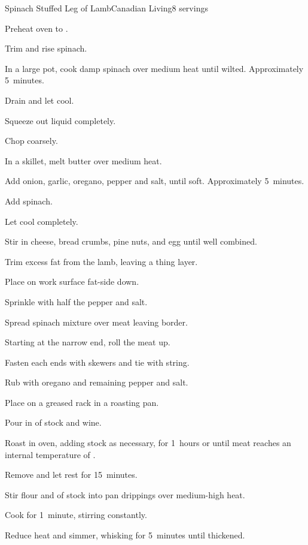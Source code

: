 \begin{recipe}{Spinach Stuffed Leg of Lamb}{Canadian Living}{8 servings}
\begin{directions}
\item Preheat oven to .
\item Trim and rise spinach.
\item In a large pot, cook damp spinach over medium heat until wilted. Approximately 5~minutes.
\item Drain and let cool.
\item Squeeze out liquid completely.
\item Chop coarsely.
\item In a skillet, melt butter over medium heat.
\item Add onion, garlic, oregano, pepper and salt, until soft. Approximately 5~minutes.
\item Add spinach.
\item Let cool completely.
\item Stir in cheese, bread crumbs, pine nuts, and egg until well combined.
\item Trim excess fat from the lamb, leaving a thing layer.
\item Place on work surface fat-side down.
\item Sprinkle with half the pepper and salt.
\item Spread spinach mixture over meat leaving  border.
\item Starting at the narrow end, roll the meat up.
\item Fasten each ends with skewers and tie with string.
\item Rub with oregano and remaining pepper and salt.
\item Place on a greased rack in a roasting pan.
\item Pour in  of stock and wine.
\item Roast in oven, adding stock as necessary, for 1\half~hours or until meat reaches an internal temperature of .
\item Remove and let rest for 15~minutes.
\item Stir flour and  of stock into pan drippings over medium-high heat.
\item Cook for 1~minute, stirring constantly.
\item Reduce heat and simmer, whisking for 5~minutes until thickened.
\end{directions}

\end{recipe}
